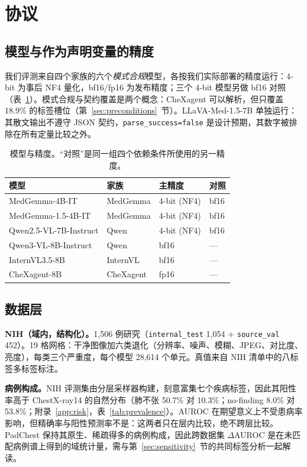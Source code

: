 \section{协议}
\label{sec:protocol}

\subsection{模型与作为声明变量的精度}

我们评测来自四个家族的六个\emph{模式合规}模型，各按我们实际部署的精度运行：4-bit 为事后 NF4 量化，bf16/fp16 为发布精度；三个 4-bit 模型另做 bf16 对照（表~\ref{tab:models}）。模式合规与契约覆盖是两个概念：CheXagent 可以解析，但只覆盖 18.9\% 的标签槽位（第~\ref{sec:preconditions}~节）。LLaVA-Med-1.5-7B 单独运行：其散文输出不遵守 JSON 契约，\texttt{parse\_success=false} 是设计预期，其数字被排除在所有定量比较之外。

\begin{table}[t]
\centering
\small
\caption{模型与精度。``对照''是同一组四个依赖条件所使用的另一精度。}
\label{tab:models}
\begin{tabular}{llll}
\toprule
模型 & 家族 & 主精度 & 对照 \\
\midrule
MedGemma-4B-IT & MedGemma & 4-bit (NF4) & bf16 \\
MedGemma-1.5-4B-IT & MedGemma & 4-bit (NF4) & bf16 \\
Qwen2.5-VL-7B-Instruct & Qwen & 4-bit (NF4) & bf16 \\
Qwen3-VL-8B-Instruct & Qwen & bf16 & --- \\
InternVL3.5-8B & InternVL & bf16 & --- \\
CheXagent-8B & CheXagent & fp16 & --- \\
\bottomrule
\end{tabular}
\end{table}

\subsection{数据层}

\textbf{NIH（域内，结构化）。}1,506 例研究（\texttt{internal\_test} 1,054 + \texttt{source\_val} 452）。19 格网格：干净图像加六类退化（分辨率、噪声、模糊、JPEG、对比度、亮度），每类三个严重度，每个模型 28,614 个单元。真值来自 NIH 清单中的八标签多标签标注。

\textbf{病例构成。}NIH 评测集由分层采样器构建，刻意富集七个疾病标签，因此其阳性率高于 ChestX-ray14 的自然分布（肺不张 50.7\% 对 10.3\%；no-finding 8.0\% 对 53.8\%；附录~\ref{app:risk}，表~\ref{tab:prevalence}）。AUROC 在期望意义上不受患病率影响，但精确率与阳性预测率不是：这两者只在层内比较，绝不跨层比较。PadChest 保持其原生、稀疏得多的病例构成，因此跨数据集 $\Delta$AUROC 是在未匹配病例谱上得到的域统计量，需与第~\ref{sec:sensitivity}~节的共同标签分析一起解读。

